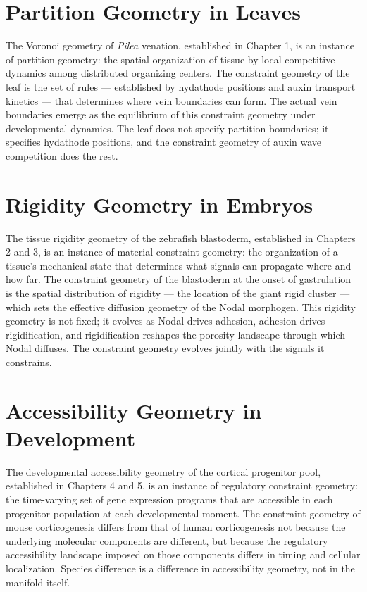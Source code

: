 \documentclass[12pt, a4paper, openany]{book}
\theoremstyle{definition}
\theoremstyle{remark}
\begin{document}
\section{Partition Geometry in Leaves}

The Voronoi geometry of \textit{Pilea} venation, established in Chapter 1, is an instance of partition geometry: the spatial organization of tissue by local competitive dynamics among distributed organizing centers. The constraint geometry of the leaf is the set of rules — established by hydathode positions and auxin transport kinetics — that determines where vein boundaries can form. The actual vein boundaries emerge as the equilibrium of this constraint geometry under developmental dynamics. The leaf does not specify partition boundaries; it specifies hydathode positions, and the constraint geometry of auxin wave competition does the rest.

\section{Rigidity Geometry in Embryos}

The tissue rigidity geometry of the zebrafish blastoderm, established in Chapters 2 and 3, is an instance of material constraint geometry: the organization of a tissue's mechanical state that determines what signals can propagate where and how far. The constraint geometry of the blastoderm at the onset of gastrulation is the spatial distribution of rigidity — the location of the giant rigid cluster — which sets the effective diffusion geometry of the Nodal morphogen. This rigidity geometry is not fixed; it evolves as Nodal drives adhesion, adhesion drives rigidification, and rigidification reshapes the porosity landscape through which Nodal diffuses. The constraint geometry evolves jointly with the signals it constrains.

\section{Accessibility Geometry in Development}

The developmental accessibility geometry of the cortical progenitor pool, established in Chapters 4 and 5, is an instance of regulatory constraint geometry: the time-varying set of gene expression programs that are accessible in each progenitor population at each developmental moment. The constraint geometry of mouse corticogenesis differs from that of human corticogenesis not because the underlying molecular components are different, but because the regulatory accessibility landscape imposed on those components differs in timing and cellular localization. Species difference is a difference in accessibility geometry, not in the manifold itself.
\end{document}
